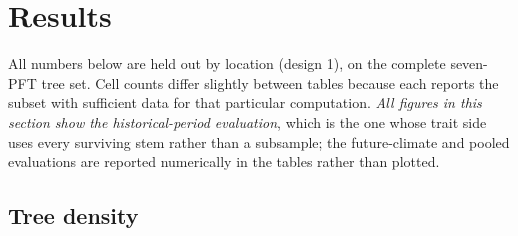 \documentclass[11pt]{article}
\begin{document}
\section{Results}
\label{sec:results}

All numbers below are held out by location (design 1), on the complete seven-PFT tree set. Cell counts differ slightly between tables because each reports the subset with sufficient data for that particular computation. \emph{All figures in this section show the historical-period evaluation}, which is the one whose trait side uses every surviving stem rather than a subsample; the future-climate and pooled evaluations are reported numerically in the tables rather than plotted.

\subsection{Tree density}
\end{document}
